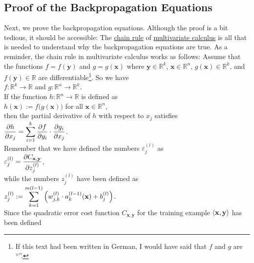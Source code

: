 \subsection{Proof of the Backpropagation Equations}
Next, we prove the backpropagation equations.  Although the proof is a bit tedious, it should be accessible: The
\href{https://en.wikipedia.org/wiki/Chain_rule}{chain rule}  of
\href{https://en.wikipedia.org/wiki/Multivariable_calculus}{multivariate calculus} is all that is needed to  
understand why the backpropagation equations are true.  As a reminder, the chain rule in multivariate calculus
works as follows: Assume that the functions $f = f(\mathbf{y})$ and $g = g(\mathbf{x})$ where $\mathbf{y} \in \mathbb{R}^k$,
$\mathbf{x} \in \mathbb{R}^n$,  $g(\mathbf{x}) \in \mathbb{R}^k$, and $f(\mathbf{y}) \in \mathbb{R}$ are
differentiable\footnote{
  If this text had been written in German, I would have said that $f$ and $g$ are ``''.
}.  So we have
\\[0.2cm]
\hspace*{1.3cm}
$f: \mathbb{R}^k \rightarrow \mathbb{R}$ \quad and \quad
$g: \mathbb{R}^n \rightarrow \mathbb{R}^k$. 
\\[0.2cm]
If the function $h: \mathbb{R}^n \rightarrow \mathbb{R}$ is defined as
\\[0.2cm]
\hspace*{1.3cm}
$h(\mathbf{x}) := f\bigl(g(\mathbf{x})\bigr)$ \quad for all $\mathbf{x} \in \mathbb{R}^n$,
\\[0.2cm]
then the partial derivative of $h$ with respect to $x_j$ satisfies
\\[0.2cm]
\hspace*{1.3cm}
$\displaystyle \frac{\partial h}{\partial x_j} = 
 \sum\limits_{i=1}^k \frac{\partial f}{\partial y_i} \cdot \frac{\partial g_i}{\partial x_j}
$.
\\[0.2cm]
Remember that we have defined the numbers $\varepsilon_j^{(l)}$ as
\\[0.2cm]
\hspace*{1.3cm}
$\displaystyle\varepsilon_j^{(l)} = \frac{\partial C_{\mathbf{x}, \mathbf{y}}}{\partial z_j^{(l)}}$,
\\[0.2cm]
while the numbers $z_j^{(l)}$ have been defined as
\\[0.2cm]
\hspace*{1.3cm}
$\displaystyle z_j^{(l)} := \sum\limits_{k=1}^{m(l-1)}  \left(w_{j,k}^{(l)} \cdot a_k^{(l-1)}(\mathbf{x}) + b_j^{(l)}\right)$.
\\[0.2cm]
Since the quadratic error cost function $C_{\mathbf{x}, \mathbf{y}}$ for the training example $\pair(\mathbf{x}, \mathbf{y})$ has been defined 
